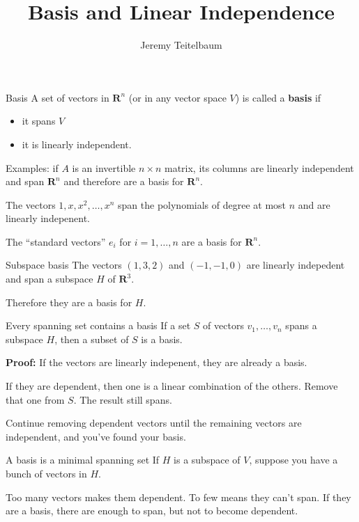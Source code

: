 \documentclass[
  ignorenonframetext,
]{beamer}
\title{Basis and Linear Independence}
\author{Jeremy Teitelbaum}
\date{}
\providecommand{\tightlist}{%
  \setlength{\itemsep}{0pt}\setlength{\parskip}{0pt}}\usepackage{longtable,booktabs,array}
\begin{document}
\frame{\titlepage}

\begin{frame}{Basis}
\label{basis}
A set of vectors in \(\mathbf{R}^{n}\) (or in any vector space \(V\)) is
called a \textbf{basis} if

\begin{itemize}
\tightlist
\item
  it spans \(V\)
\item
  it is linearly independent.
\end{itemize}

Examples: if \(A\) is an invertible \(n\times n\) matrix, its columns
are linearly independent and span \(\mathbf{R}^{n}\) and therefore are a
basis for \(\mathbf{R}^{n}\).

The vectors \(1,x,x^2,\ldots, x^n\) span the polynomials of degree at
most \(n\) and are linearly indepenent.

The ``standard vectors'' \(e_{i}\) for \(i=1,\ldots, n\) are a basis for
\(\mathbf{R}^{n}\).
\end{frame}

\begin{frame}{Subspace basis}
\label{subspace-basis}
The vectors \((1,3,2)\) and \((-1,-1,0)\) are linearly indepedent and
span a subspace \(H\) of \(\mathbf{R}^{3}\).

Therefore they are a basis for \(H\).
\end{frame}

\begin{frame}{Every spanning set contains a basis}
\label{every-spanning-set-contains-a-basis}
If a set \(S\) of vectors \(v_1,\ldots, v_n\) spans a subspace \(H\),
then a subset of \(S\) is a basis.

\textbf{Proof:} If the vectors are linearly indepenent, they are already
a basis.

If they are dependent, then one is a linear combination of the others.
Remove that one from \(S\). The result still spans.

Continue removing dependent vectors until the remaining vectors are
independent, and you've found your basis.
\end{frame}

\begin{frame}{A basis is a minimal spanning set}
\label{a-basis-is-a-minimal-spanning-set}
If \(H\) is a subspace of \(V\), suppose you have a bunch of vectors in
\(H\).

Too many vectors makes them dependent. To few means they can't span. If
they are a basis, there are enough to span, but not to become dependent.
\end{frame}
\end{document}
